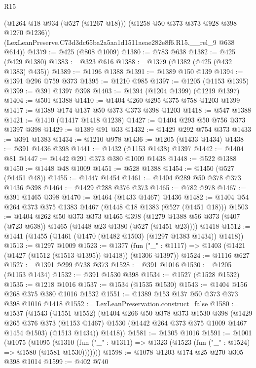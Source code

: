 \begin{lexlean}{R15}
\begin{coremodule}
        (@1264 @18 @934 (@527 (@1267 @18)))
        (@1258 @50 @373 @373 @928 @398 @1270 @1236))
      (LexLeanPreserve.C73d3dc65ba2a5aa1d1511aeae282e8f6.R15.__rel_9 @638 @614))
@1379 := @425 (@808 @1009)
@1380 := @783 @638
@1382 := @425 (@429 @1380)
@1383 := @323 @616
@1388 := @1379 (@1382 (@425 (@432 @1383) @435))
@1389 := @1196 @1388
@1391 := @1389 @150 @139
@1394 := @1391 @296 @759 @373
@1395 := @1210 @985
@1397 := @1205 (@1153 @1395)
@1399 := @391 @1397 @398
@1403 := @1394 (@1204 @1399) (@1219 @1397)
@1404 := @501 @1388
@1410 := @1404 @260 @295 @375 @758 @1203 @1399
@1417 := @1389 @174 @137 @50 @373 @373 @398 @1203
@1418 := @547 @1388
@1421 := @1410 (@1417 @1418 @1238)
@1427 := @1404 @293 @50 @756 @373 @1397 @398
@1429 := @1389 @91 @33
@1432 := @1429 @292 @754 @373
@1433 := @391 @1383
@1434 := @1210 @978
@1436 := @1205 (@1433 @1434)
@1438 := @391 @1436 @398
@1441 := @1432 (@1153 @1438) @1397
@1442 := @1404 @81
@1447 := @1442 @291 @373 @380 @1009 @1438
@1448 := @522 @1388
@1450 := @1448 @48 @1009
@1451 := @528 @1388
@1454 := @1450 (@527 (@1451 @48))
@1455 := @1447 @1454
@1461 := @1404 @289 @50 @378 @373 @1436 @398
@1464 := @1429 @288 @376 @373
@1465 := @782 @978
@1467 := @391 @1465 @398
@1470 := @1464 (@1433 @1467) @1436
@1482 := @1404 @54 @264 @373 @375 @1383 @1467 (@1448 @18 @1383 (@527 (@1451 @18)))
@1503 := @1404
    @262
    @50
    @373
    @373
    @1465
    @398
    (@1279 @1388 @56 @373 (@407 (@723 @638)) @1465 (@1448 @23 @1380 (@527 (@1451 @23))))
    @1418
@1512 := @1441 (@1455 (@1461 (@1470 (@1482 @1503) (@1297 @1383 @1434)) @1418))
@1513 := @1297 @1009
@1523 := @1377
    (fun ("_" : @1117) => @1403 (@1421 (@1427 (@1512 (@1513 @1395)) @1418)) (@1306 @1397))
@1524 := @1116 @627
@1527 := @1391 @299 @738 @373
@1528 := @391 @1016
@1530 := @1205 (@1153 @1434)
@1532 := @391 @1530 @398
@1534 := @1527 (@1528 @1532)
@1535 := @1218 @1016
@1537 := @1534 (@1535 @1530)
@1543 := @1404 @156 @268 @375 @380 @1016 @1532
@1551 := @1389 @153 @137 @50 @373 @373 @398 @1016 @1418
@1552 := LexLeanPreservation.construct_false
@1580 := @1537
    (@1543
      (@1551 @1552)
      (@1404
        @266
        @50
        @378
        @373
        @1530
        @398
        (@1429
          @265
          @376
          @373
          (@1153 @1467)
          @1530
          (@1442 @264 @373 @375 @1009 @1467 @1454 @1503)
          (@1513 @1434))
        @1418))
@1581 := @1305 @1016
@1591 := @1001
    (@1075
      (@1095
        (@1310 (fun ("_" : @1311) => @1323 (@1523 (fun ("_" : @1524) => @1580 (@1581 @1530)))))))
@1598 := @1078 @1203 @174 @25 @270 @305 @398 @1014
@1599 := @402 @740

\end{coremodule}
\end{lexlean}
